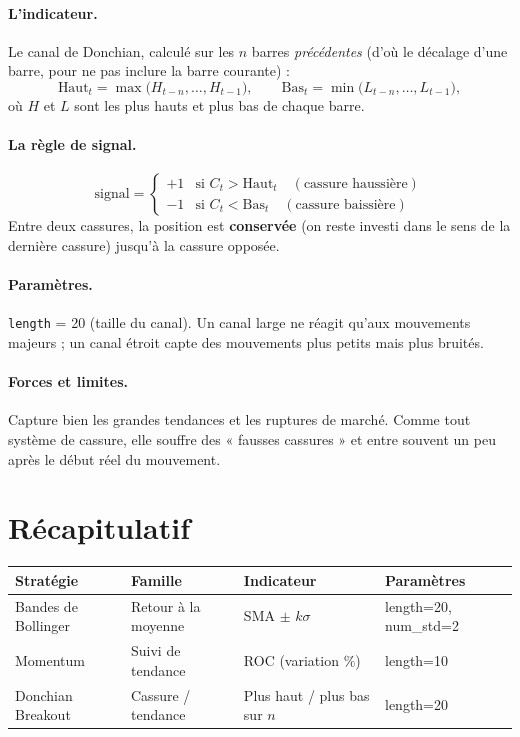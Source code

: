\documentclass[11pt,a4paper]{article}
\newcommand{\code}[1]{\texttt{#1}}
\begin{document}
\paragraph{L'indicateur.} Le canal de Donchian, calculé sur les $n$ barres
\emph{précédentes} (d'où le décalage d'une barre, pour ne pas inclure la barre
courante) :
\[
  \text{Haut}_t = \max\bigl(H_{t-n},\dots,H_{t-1}\bigr), \qquad
  \text{Bas}_t = \min\bigl(L_{t-n},\dots,L_{t-1}\bigr),
\]
où $H$ et $L$ sont les plus hauts et plus bas de chaque barre.

\paragraph{La règle de signal.}
\[
  \text{signal} =
  \begin{cases}
    +1 & \text{si } C_t > \text{Haut}_t \quad(\text{cassure haussière})\\
    -1 & \text{si } C_t < \text{Bas}_t \quad(\text{cassure baissière})
  \end{cases}
\]
Entre deux cassures, la position est \textbf{conservée} (on reste investi dans
le sens de la dernière cassure) jusqu'à la cassure opposée.

\paragraph{Paramètres.} \code{length} = 20 (taille du canal). Un canal large
ne réagit qu'aux mouvements majeurs ; un canal étroit capte des mouvements plus
petits mais plus bruités.

\paragraph{Forces et limites.} Capture bien les grandes tendances et les
ruptures de marché. Comme tout système de cassure, elle souffre des « fausses
cassures » et entre souvent un peu après le début réel du mouvement.

\section{Récapitulatif}

\begin{center}
\begin{tabular}{@{}llll@{}}
\toprule
\textbf{Stratégie} & \textbf{Famille} & \textbf{Indicateur} & \textbf{Paramètres} \\
\midrule
Bandes de Bollinger & Retour à la moyenne & SMA $\pm$ $k\sigma$        & length=20, num\_std=2 \\
Momentum            & Suivi de tendance   & ROC (variation \%)         & length=10 \\
Donchian Breakout   & Cassure / tendance  & Plus haut / plus bas sur $n$ & length=20 \\
\bottomrule
\end{tabular}
\end{center}
\end{document}
